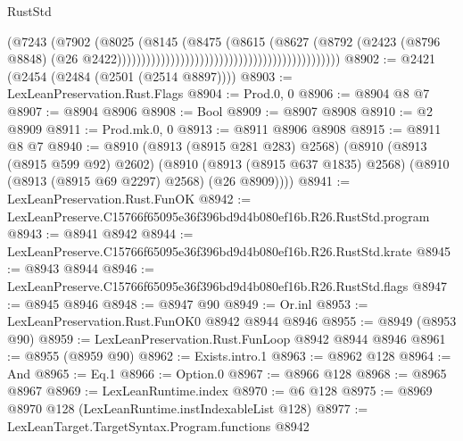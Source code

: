 \begin{lexlean}{RustStd}
\begin{coremodule}
                                                                            (@7243
                                                                              (@7902
                                                                                (@8025
                                                                                  (@8145
                                                                                    (@8475
                                                                                      (@8615
                                                                                        (@8627
                                                                                          (@8792
                                                                                            (@2423
                                                                                              (@8796
                                                                                                @8848)
                                                                                              (@26
                                                                                                @2422))))))))))))))))))))))))))))))))))))))))))))))
@8902 := @2421 (@2454 (@2484 (@2501 (@2514 @8897))))
@8903 := LexLeanPreservation.Rust.Flags
@8904 := Prod.{0, 0}
@8906 := @8904 @8 @7
@8907 := @8904 @8906
@8908 := Bool
@8909 := @8907 @8908
@8910 := @2 @8909
@8911 := Prod.mk.{0, 0}
@8913 := @8911 @8906 @8908
@8915 := @8911 @8 @7
@8940 := @8910
    (@8913 (@8915 @281 @283) @2568)
    (@8910
      (@8913 (@8915 @599 @92) @2602)
      (@8910 (@8913 (@8915 @637 @1835) @2568) (@8910 (@8913 (@8915 @69 @2297) @2568) (@26 @8909))))
@8941 := LexLeanPreservation.Rust.FunOK
@8942 := LexLeanPreserve.C15766f65095e36f396bd9d4b080ef16b.R26.RustStd.program
@8943 := @8941 @8942
@8944 := LexLeanPreserve.C15766f65095e36f396bd9d4b080ef16b.R26.RustStd.krate
@8945 := @8943 @8944
@8946 := LexLeanPreserve.C15766f65095e36f396bd9d4b080ef16b.R26.RustStd.flags
@8947 := @8945 @8946
@8948 := @8947 @90
@8949 := Or.inl
@8953 := LexLeanPreservation.Rust.FunOK0 @8942 @8944 @8946
@8955 := @8949 (@8953 @90)
@8959 := LexLeanPreservation.Rust.FunLoop @8942 @8944 @8946
@8961 := @8955 (@8959 @90)
@8962 := Exists.intro.{1}
@8963 := @8962 @128
@8964 := And
@8965 := Eq.{1}
@8966 := Option.{0}
@8967 := @8966 @128
@8968 := @8965 @8967
@8969 := LexLeanRuntime.index
@8970 := @6 @128
@8975 := @8969 @8970 @128 (LexLeanRuntime.instIndexableList @128)
@8977 := LexLeanTarget.TargetSyntax.Program.functions @8942

\end{coremodule}
\end{lexlean}

